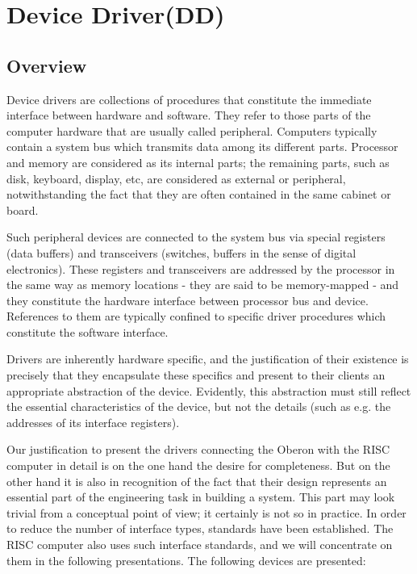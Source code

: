 \chapter{Device Driver(DD)}
\label{ch:DD}
\section{Overview}
Device drivers are collections of procedures that constitute the immediate interface between
hardware and software. They refer to those parts of the computer hardware that are usually called
peripheral. Computers typically contain a system bus which transmits data among its different parts.
Processor and memory are considered as its internal parts; the remaining parts, such as disk,
keyboard, display, etc, are considered as external or peripheral, notwithstanding the fact that they
are often contained in the same cabinet or board.

Such peripheral devices are connected to the system bus via special registers (data buffers) and
transceivers (switches, buffers in the sense of digital electronics). These registers and transceivers
are addressed by the processor in the same way as memory locations - they are said to be
memory-mapped - and they constitute the hardware interface between processor bus and device.
References to them are typically confined to specific driver procedures which constitute the
software interface.

Drivers are inherently hardware specific, and the justification of their existence is precisely that they
encapsulate these specifics and present to their clients an appropriate abstraction of the device.
Evidently, this abstraction must still reflect the essential characteristics of the device, but not the
details (such as e.g. the addresses of its interface registers).

Our justification to present the drivers connecting the Oberon with the RISC computer in
detail is on the one hand the desire for completeness. But on the other hand it is also in recognition
of the fact that their design represents an essential part of the engineering task in building a
system. This part may look trivial from a conceptual point of view; it certainly is not so in practice.
In order to reduce the number of interface types, standards have been established. The RISC
computer also uses such interface standards, and we will concentrate on them in the following
presentations. The following devices are presented:

